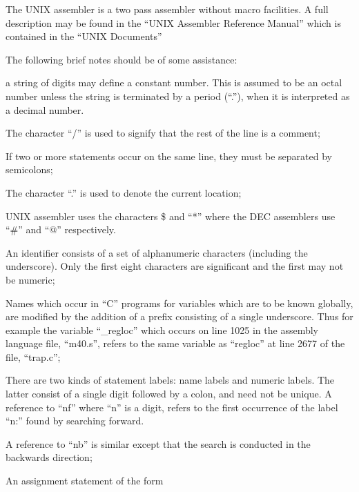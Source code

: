 
The UNIX assembler is a two pass assembler
without macro facilities. A full
description may be found in the ``UNIX
Assembler Reference Manual'' which is
contained in the ``UNIX Documents''

The following brief notes should be of
some assistance:

\bd
\item[(a)] a string of digits may define a
constant number. This is assumed
to be an octal number unless the
string is terminated by a period
(``.''), when it is interpreted as
a decimal number.


\item[(b)] The character ``/'' is used to
signify that the rest of the
line is a comment;

\item[(c)] If two or more statements occur
on the same line, they must be
separated by semicolons;

\item[(d)] The character ``.'' is used to
denote the current location;

\item[(e)] UNIX assembler uses the characters \$
and ``*'' where the DEC
assemblers use ``\#'' and ``@''
respectively.

\item[(f)] An identifier consists of a set
of alphanumeric characters
(including the underscore).
Only the first eight characters
are significant and the first
may not be numeric;

\item[(g)] Names which occur in ``C'' programs
for variables which are to
be known globally, are modified
by the addition of a prefix consisting
of a single underscore.
Thus for example the variable
``\_regloc'' which occurs on line
1025 in the assembly language
file, ``m40.s'', refers to the
same variable as ``regloc'' at
line 2677 of the file, ``trap.c'';

\item[(h)] There are two kinds of statement
labels: name labels and numeric
labels. The latter consist of a
single digit followed by a
colon, and need not be unique.
A reference to ``nf'' where ``n'' is
a digit, refers to the first
occurrence of the label ``n:''
found by searching forward.

A reference to ``nb'' is similar
except that the search is conducted in
the backwards direction;

\item[(i)] An assignment statement of the
form

